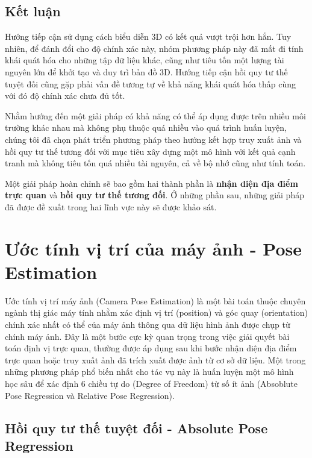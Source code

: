 \subsection{Kết luận}
Hướng tiếp cận sử dụng cách biểu diễn 3D có kết quả vượt trội hơn hẳn. Tuy nhiên, để đánh đổi cho độ chính xác này, nhóm phương pháp này đã mất đi tính khái quát hóa cho những tập dữ liệu khác, cũng như tiêu tốn một lượng tài nguyên lớn để khởi tạo và duy trì bản đồ 3D. Hướng tiếp cận hồi quy tư thế tuyệt đối cũng gặp phải vấn đề tương tự về khả năng khái quát hóa thấp cùng với đó độ chính xác chưa đủ tốt.

Nhằm hướng đến một giải pháp có khả năng có thể áp dụng được trên nhiều môi trường khác nhau mà không phụ thuộc quá nhiều vào quá trình huấn luyện, chúng tôi đã chọn phát triển phương pháp theo hướng kết hợp truy xuất ảnh và hồi quy tư thế tương đối với mục tiêu xây dựng một mô hình với kết quả cạnh tranh mà không tiêu tốn quá nhiều tài nguyên, cả về bộ nhớ cũng như tính toán.

Một giải pháp hoàn chỉnh sẽ bao gồm hai thành phần là \textbf{nhận diện địa điểm trực quan} và \textbf{hồi quy tư thế tương đối}. Ở những phần sau, những giải pháp đã được đề xuất trong hai lĩnh vực này sẽ được khảo sát.




\section{Ước tính vị trí của máy ảnh - Pose Estimation}

Ước tính vị trí máy ảnh (Camera Pose Estimation) là một bài toán thuộc chuyên ngành thị giác máy tính nhằm xác định vị trí (position) và góc quay (orientation) chính xác nhất có thể của máy ảnh thông qua dữ liệu hình ảnh được chụp từ chính máy ảnh. Đây là một bước cực kỳ quan trọng trong việc giải quyết bài toán định vị trực quan, thường được áp dụng sau khi bước nhận diện địa điểm trực quan hoặc truy xuất ảnh đã trích xuất được ảnh từ cơ sở dữ liệu. Một trong những phương pháp phổ biến nhất cho tác vụ này là huấn luyện một mô hình học sâu để xác định 6 chiều tự do (Degree of Freedom) từ số ít ảnh (Absoblute Pose Regression và Relative Pose Regression).

\subsection{Hồi quy tư thế tuyệt đối - Absolute Pose Regression}

